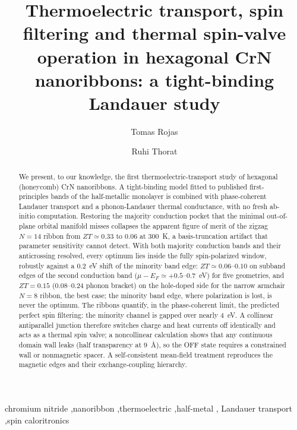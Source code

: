 \documentclass[preprint,12pt]{elsarticle}
\begin{document}
\begin{frontmatter}

\title{Thermoelectric transport, spin filtering and thermal spin-valve operation in
hexagonal CrN nanoribbons: a tight-binding Landauer study}

\author[aff1,aff2]{Tomas Rojas}
\author[aff3]{Ruhi Thorat}
\address[aff1]{Sede de Occidente, Universidad de Costa Rica, San Ram\'on, Costa Rica}
\address[aff2]{Centro de Investigaci\'on en Ciencia e Ingenier\'ia de Materiales (CICIMA),
Universidad de Costa Rica, San Jos\'e, Costa Rica}
\address[aff3]{Department of Physics and Astronomy, Ohio University, Athens, Ohio, USA}

\begin{abstract}
We present, to our knowledge, the first thermoelectric-transport study of hexagonal
(honeycomb) CrN nanoribbons. A tight-binding model fitted to published first-principles bands
of the half-metallic monolayer is combined with phase-coherent Landauer transport and a
phonon-Landauer thermal conductance, with no fresh ab-initio computation. Restoring the majority
conduction pocket that the minimal out-of-plane orbital manifold misses collapses the apparent
figure of merit of the zigzag $N{=}14$ ribbon from $ZT\simeq0.33$ to $0.06$ at $300$~K, a
basis-truncation artifact that parameter sensitivity cannot detect. With both majority
conduction bands and their anticrossing resolved, every optimum lies inside the fully
spin-polarized window, robustly against a $0.2$~eV shift of the minority band edge:
$ZT\simeq0.06$--$0.10$ on subband edges of the second conduction band
($\mu-E_F\simeq+0.5$--$0.7$~eV) for five geometries, and $ZT=0.15$ ($0.08$--$0.24$ phonon
bracket) on the hole-doped side for the narrow armchair $N{=}8$ ribbon, the best case; the
minority band edge, where polarization is lost, is never the optimum. The ribbons
quantify, in the phase-coherent limit, the predicted perfect spin filtering: the minority
channel is gapped over nearly $4$~eV. A collinear antiparallel junction therefore switches
charge and heat currents off identically and acts as a thermal spin valve; a noncollinear
calculation shows that any continuous domain wall leaks (half transparency at $9$~\AA), so the
OFF state requires a constrained wall or nonmagnetic spacer. A self-consistent mean-field
treatment reproduces the magnetic edges and their exchange-coupling hierarchy.
\end{abstract}

\begin{keyword}
chromium nitride \sep nanoribbon \sep thermoelectric \sep half-metal \sep
Landauer transport \sep spin caloritronics
\end{keyword}

\end{frontmatter}
\end{document}
